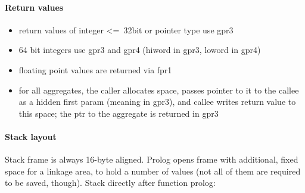 \paragraph{Return values}

\begin{itemize}
\item return values of integer \textless=\ 32bit or pointer type use gpr3
\item 64 bit integers use gpr3 and gpr4 (hiword in gpr3, loword in gpr4)
\item floating point values are returned via fpr1
\item for all aggregates, the caller allocates space, passes pointer to it to the callee as a hidden first param
(meaning in gpr3), and callee writes return value to this space; the ptr to the aggregate is returned in gpr3
\end{itemize}


\paragraph{Stack layout}

Stack frame is always 16-byte aligned. Prolog opens frame with additional, fixed space for a linkage area, to hold a number of values (not all of them are required to be saved, though). Stack directly after function prolog:\\

